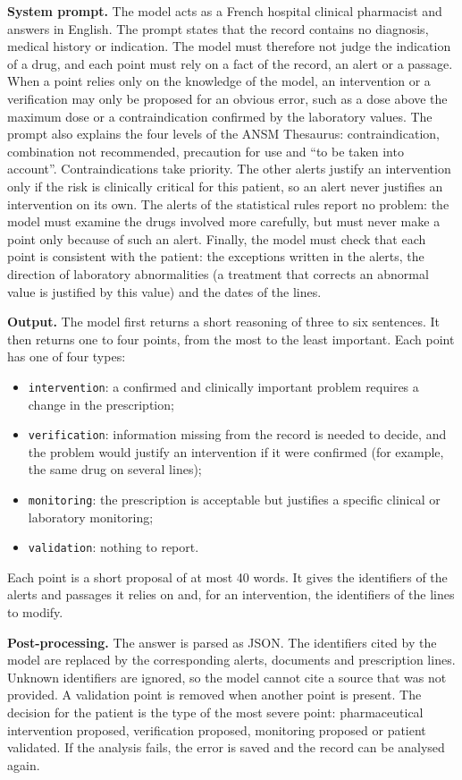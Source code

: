 \documentclass{article}
\begin{document}
\textbf{System prompt.} The model acts as a French hospital clinical pharmacist and answers in English. The prompt states that the record contains no diagnosis, medical history or indication. The model must therefore not judge the indication of a drug, and each point must rely on a fact of the record, an alert or a passage. When a point relies only on the knowledge of the model, an intervention or a verification may only be proposed for an obvious error, such as a dose above the maximum dose or a contraindication confirmed by the laboratory values. The prompt also explains the four levels of the ANSM Thesaurus: contraindication, combination not recommended, precaution for use and ``to be taken into account''. Contraindications take priority. The other alerts justify an intervention only if the risk is clinically critical for this patient, so an alert never justifies an intervention on its own. The alerts of the statistical rules report no problem: the model must examine the drugs involved more carefully, but must never make a point only because of such an alert. Finally, the model must check that each point is consistent with the patient: the exceptions written in the alerts, the direction of laboratory abnormalities (a treatment that corrects an abnormal value is justified by this value) and the dates of the lines.

\textbf{Output.} The model first returns a short reasoning of three to six sentences. It then returns one to four points, from the most to the least important. Each point has one of four types:
\begin{itemize}
	\item \texttt{intervention}: a confirmed and clinically important problem requires a change in the prescription;
	\item \texttt{verification}: information missing from the record is needed to decide, and the problem would justify an intervention if it were confirmed (for example, the same drug on several lines);
	\item \texttt{monitoring}: the prescription is acceptable but justifies a specific clinical or laboratory monitoring;
	\item \texttt{validation}: nothing to report.
\end{itemize}
Each point is a short proposal of at most 40 words. It gives the identifiers of the alerts and passages it relies on and, for an intervention, the identifiers of the lines to modify.

\textbf{Post-processing.} The answer is parsed as JSON. The identifiers cited by the model are replaced by the corresponding alerts, documents and prescription lines. Unknown identifiers are ignored, so the model cannot cite a source that was not provided. A validation point is removed when another point is present. The decision for the patient is the type of the most severe point: pharmaceutical intervention proposed, verification proposed, monitoring proposed or patient validated. If the analysis fails, the error is saved and the record can be analysed again.
\end{document}
